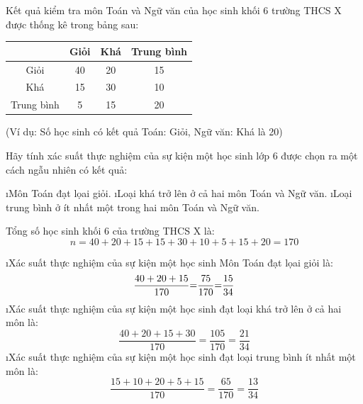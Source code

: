 \begin{bt}
	Kết quả kiểm tra môn Toán và Ngữ văn của học sinh khối 6 trường THCS X được thống kê trong bảng sau:
	\begin{center}
		\begin{tabular}{|c|c|c|c|}
			\hline
			\backslashbox{Toán}{Ngữ Văm}&	Giỏi&	Khá	&Trung bình\\
			\hline
			Giỏi & 40& 20& 15 \\
			\hline	 
			Khá	 & 15 & 30&10\\
			\hline
			Trung bình & 5& 15& 20\\
			\hline	
		\end{tabular}
	\end{center} 
	(Ví dụ: Số học sinh có kết quả Toán: Giỏi, Ngữ văn: Khá là 20)
	
	Hãy tính xác suất thực nghiệm của sự kiện một học sinh lớp 6 được chọn ra một cách ngẫu nhiên có kết quả:
	\begin{enumerate}[a),leftmargin=*]
		\i Môn Toán đạt lọai giỏi.
		\i Loại khá trở lên ở cả hai môn Toán và Ngữ văn.
		\i Loại trung bình ở ít nhất một trong hai môn Toán và Ngữ văn.
	\end{enumerate}
	\begin{loigiaichuong41}
		Tổng số học sinh khối 6 của trường THCS X là:\[n  =  40  +  20  + 15  + 15  +  30  +  10  +  5  +  15  +  20  =  170\]
		\begin{enumerate}[a),leftmargin=*]
			\i Xác suất thực nghiệm của sự kiện một học sinh Môn Toán đạt lọai giỏi là:
			\[\dfrac{{{\rm{40 + 20 + 15}}}}{{{\rm{170}}}}{\rm{ = }}\dfrac{{{\rm{75}}}}{{{\rm{170}}}}{\rm{ = }}\dfrac{{{\rm{15}}}}{{{\rm{34}}}}\]
			\i Xác suất thực nghiệm cůa sự kiện một học sinh đạt loại khá trở lên ở cả hai môn là:      
			\[\dfrac{{40 + 20 + 15 + 30}}{{170}} = \dfrac{{105}}{{170}} = \dfrac{{21}}{{34}}\]                       
			\i Xác suất thực nghiệm cůa sự kiện một học sinh đạt loại trung bình ít nhất một môn là: 
			\[\dfrac{{15 + 10 + 20 + 5 + 15}}{{170}} = \dfrac{{65}}{{170}} = \dfrac{{13}}{{34}}\] 
		\end{enumerate}
	\end{loigiaichuong41}
\end{bt}
